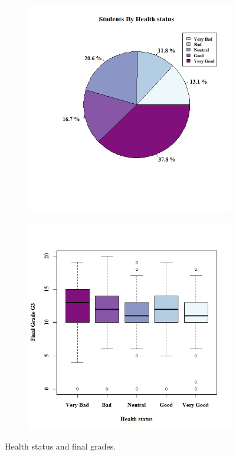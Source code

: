 \documentclass[a4paper, 11pt]{article}
\begin{document}
	\begin{figure}[h!]
		\centering
		\begin{subfigure}[b]{0.4\linewidth}
			\hspace*{-1.2in}
			\includegraphics[width=1.5\linewidth]{health.jpeg}
		\end{subfigure}
		\begin{subfigure}[b]{0.4\linewidth}
			\includegraphics[width=1.5\linewidth]{health_grades.jpeg}
		\end{subfigure}
		\caption*{Health status and final grades.}
		\label{fig:health_grades}
	\end{figure}
\end{document}

